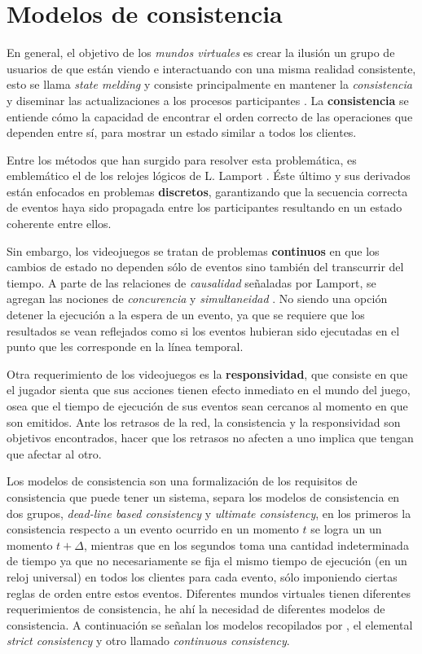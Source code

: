 \section{Modelos de consistencia}

En general, el objetivo de los \emph{mundos virtuales} es crear la ilusión un grupo de usuarios de que están viendo e interactuando con una misma realidad consistente, esto se llama \emph{state melding} y consiste principalmente en mantener la \emph{consistencia} y diseminar las actualizaciones a los procesos participantes \cite{liu2012survey}. La \textbf{consistencia} se entiende cómo la capacidad de encontrar el orden correcto de las operaciones que dependen entre sí, para mostrar un estado similar a todos los clientes.

Entre los métodos que han surgido para resolver esta problemática, es emblemático el de los relojes lógicos de L. Lamport \cite{lamport1978time}. Éste último y sus derivados están enfocados en problemas \textbf{discretos}, garantizando que la secuencia correcta de eventos haya sido propagada entre los participantes resultando en un estado coherente entre ellos.

Sin embargo, los videojuegos se tratan de problemas \textbf{continuos} en que los cambios de estado no dependen sólo de eventos sino también del transcurrir del tiempo. A parte de las relaciones de \emph{causalidad} señaladas por Lamport, se agregan las nociones de \emph{concurencia} y \emph{simultaneidad} \cite{liu2012survey}. No siendo una opción detener la ejecución a la espera de un evento, ya que se requiere que los resultados se vean reflejados como si los eventos hubieran sido ejecutadas en el punto que les corresponde en la línea temporal\cite{mauve2004local}.

Otra requerimiento de los videojuegos es la \textbf{responsividad}, que consiste en que el jugador sienta que sus acciones tienen efecto inmediato en el mundo del juego, osea que el tiempo de ejecución de sus eventos sean cercanos al momento en que son emitidos. Ante los retrasos de la red, la consistencia y la responsividad son objetivos encontrados, hacer que los retrasos no afecten a uno implica que tengan que afectar al otro.

Los modelos de consistencia son una formalización de los requisitos de consistencia que puede tener un sistema, \cite{liu2012survey} separa los modelos de consistencia en dos grupos, \emph{dead-line based consistency} y \emph{ultimate consistency}, en los primeros la consistencia respecto a un evento ocurrido en un momento $t$ se logra un un momento $t+\Delta$, mientras que en los segundos toma una cantidad indeterminada de tiempo ya que no necesariamente se fija el mismo tiempo de ejecución (en un reloj universal) en todos los clientes para cada evento, sólo imponiendo ciertas reglas de orden entre estos eventos. Diferentes mundos virtuales tienen diferentes requerimientos de consistencia, he ahí la necesidad de diferentes modelos de consistencia. A continuación se señalan los modelos recopilados por \cite{liu2012survey}, el elemental \emph{strict consistency} y otro llamado \emph{continuous consistency}.

